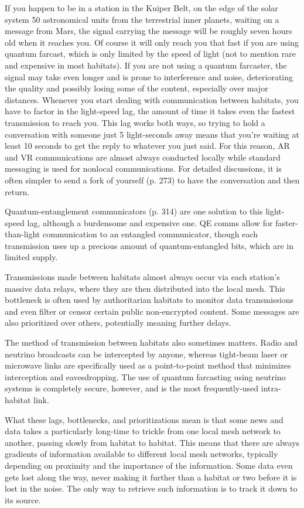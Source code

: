 If you happen to be in a station in the Kuiper Belt, on the edge of the solar system 50 astronomical units from the terrestrial inner planets, waiting on a message from Mars, the signal carrying the message will be roughly seven hours old when it reaches you. Of course it will only reach you that fast if you are using quantum farcast, which is only limited by the speed of light (not to mention rare and expensive in most habitats). If you are not using a quantum farcaster, the signal may take even longer and is prone to interference and noise, deteriorating the quality and possibly losing some of the content, especially over major distances. Whenever you start dealing with communication between habitats, you have to factor in the light-speed lag, the amount of time it takes even the fastest transmission to reach you. This lag works both ways, so trying to hold a conversation with someone just 5 light-seconds away means that you're waiting at least 10 seconds to get the reply to whatever you just said. For this reason, AR and VR communications are almost always conducted locally while standard messaging is used for nonlocal communications. For detailed discussions, it is often simpler to send a fork of yourself (p. 273) to have the conversation and then return. 

Quantum-entanglement communicators (p. 314) are one solution to this light-speed lag, although a burdensome and expensive one. QE comms allow for faster-than-light communication to an entangled communicator, though each transmission uses up a precious amount of quantum-entangled bits, which are in limited supply. 

Transmissions made between habitats almost always occur via each station's massive data relays, where they are then distributed into the local mesh. This bottleneck is often used by authoritarian habitats to monitor data transmissions and even filter or censor certain public non-encrypted content. Some messages are also prioritized over others, potentially meaning further delays. 



The method of transmission between habitats also sometimes matters. Radio and neutrino broadcasts can be intercepted by anyone, whereas tight-beam laser or microwave links are specifically used as a point-to-point method that minimizes interception and eavesdropping. The use of quantum farcasting using neutrino systems is completely secure, however, and is the most frequently-used intra-habitat link. 

What these lags, bottlenecks, and prioritizations mean is that some news and data takes a particularly long-time to trickle from one local mesh network to another, passing slowly from habitat to habitat. This means that there are always gradients of information available to different local mesh networks, typically depending on proximity and the importance of the information. Some data even gets lost along the way, never making it further than a habitat or two before it is lost in the noise. The only way to retrieve such information is to track it down to its source. 

